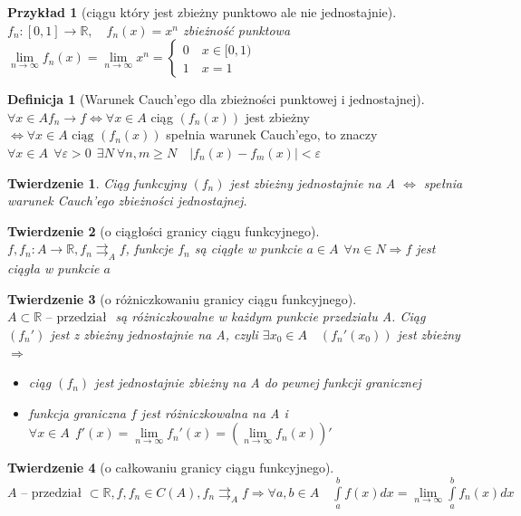 \documentclass[12pt,a4paper]{article}
\newtheorem{tw}{Twierdzenie}
\newtheorem{przyklad}{Przykład}
\theoremstyle{definition}
\newtheorem{df}{Definicja}
\begin{document}
\begin{przyklad}[ciągu który jest zbieżny punktowo ale nie jednostajnie]
$f_n: [0,1] \to \mathbb{R}, \quad f_n(x) = x^n$ zbieżność punktowa
$
	\lim\limits_{n\to\infty}f_n(x) = \lim\limits_{n\to\infty}x^n = 
	\begin{cases}
	0 \quad x\in[0,1)\\
	1 \quad x=1
	\end{cases}
$
\end{przyklad}

\begin{df}[Warunek Cauch'ego dla zbieżności punktowej i jednostajnej]~\\
$\forall x\in A f_n \rightarrow f \Leftrightarrow \forall x\in A$ ciąg $(f_n(x))$ jest zbieżny $\Leftrightarrow \forall x\in A \text{ ciąg } (f_n(x))$ spełnia warunek Cauch'ego, to znaczy 
$\forall x\in A ~~ \forall \varepsilon>0 ~~ \exists N ~ \forall n,m \geqslant N \quad |f_n(x) - f_m(x)| < \varepsilon$ 
\end{df}

\begin{tw}
Ciąg funkcyjny $(f_n)$ jest zbieżny jednostajnie na A $\Leftrightarrow$ spełnia warunek Cauch'ego zbieżności jednostajnej.
\end{tw}

\begin{tw}[o ciągłości granicy ciągu funkcyjnego]~\\
$f, f_n: A\to \mathbb{R}, f_n \rightrightarrows_A f$, funkcje $f_n$ są ciągłe w punkcie $a\in A ~~ \forall n\in N \Rightarrow f$ jest ciągła w punkcie $a$
\end{tw}

\begin{tw}[o różniczkowaniu granicy ciągu funkcyjnego]~\\
$A \subset \mathbb{R} \text{ -- przedział }$ są różniczkowalne w każdym punkcie przedziału A. Ciąg $(f_n')$ jest z zbieżny jednostajnie na A, czyli $\exists x_0 \in A  \quad (f_n'(x_0))$ jest zbieżny $\Rightarrow$
\begin{itemize}
	\item ciąg $(f_n)$ jest jednostajnie zbieżny na A do pewnej funkcji granicznej
	\item funkcja graniczna $f$ jest różniczkowalna na A i $\forall x\in A ~~ f'(x) = \lim\limits_{n\to\infty} f_n'(x) = (\lim\limits_{n\to\infty} f_n(x))'$
\end{itemize}
\end{tw}

\begin{tw}[o całkowaniu granicy ciągu funkcyjnego]~\\
$A \text{ -- przedział } \subset \mathbb{R}, f, f_n \in C(A), f_n \rightrightarrows_A f \Rightarrow \forall a,b \in A \quad \int\limits_a^bf(x)dx = \lim\limits_{n\to\infty}\int\limits_a^bf_n(x)dx$ 
\end{tw}
\end{document}
